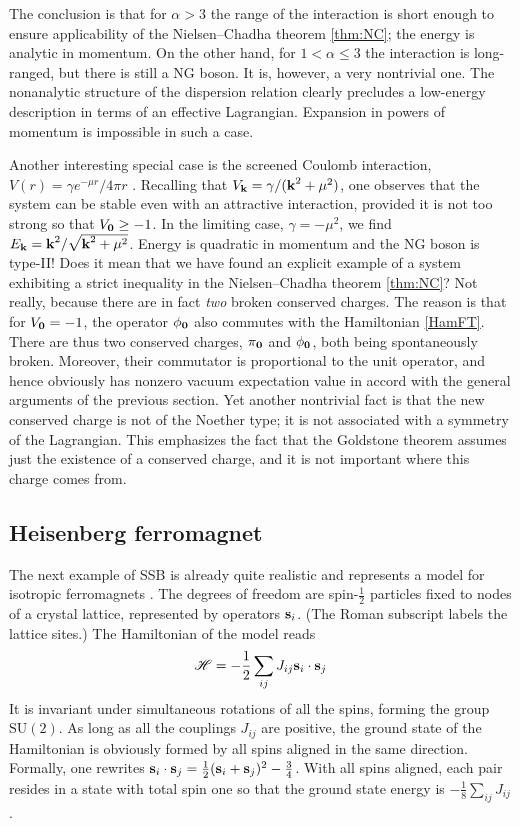 \documentclass[final,2p,times,12pt,sort&compress]{elsarticle}
\newcommand\gr[1]{\mathrm{#1}}              %
\newcommand\Ham{\mathscr{H}}                %
\newcommand\vek[1]{{\boldsymbol{\bf #1}}}   %
\begin{document}
The conclusion is that for $\alpha>3$ the range of the interaction is short
enough to ensure applicability of the Nielsen--Chadha theorem \ref{thm:NC}; the
energy is analytic in momentum. On the other hand, for $1<\alpha\leq3$ the
interaction is long-ranged, but there is still a NG boson. It is, however, a
very nontrivial one. The nonanalytic structure of the dispersion relation
clearly precludes a low-energy description in terms of an effective Lagrangian.
Expansion in powers of momentum is impossible in such a case.

Another interesting special case is the screened Coulomb interaction,
$V(r)=\gamma e^{-\mu r}/4\pi r$ \cite{Guralnik:1968gu}. Recalling that $V_{\vek
k}=\gamma/(\vek k^2+\mu^2)$, one observes that the system can be stable even
with an attractive interaction, provided it is not too strong so that
$V_{\vek0}\geq-1$. In the limiting case, $\gamma=-\mu^2$, we find $E_{\vek
k}=\vek k^2/\sqrt{\vek k^2+\mu^2}$. Energy is quadratic in momentum and the NG
boson is type-II! Does it mean that we have found an explicit example of a
system exhibiting a strict inequality in the Nielsen--Chadha theorem
\ref{thm:NC}? Not really, because there are in fact \emph{two} broken conserved
charges. The reason is that for $V_{\vek0}=-1$, the operator $\phi_{\vek0}$
also commutes with the Hamiltonian \eqref{HamFT}. There are thus two conserved
charges, $\pi_{\vek0}$ and $\phi_{\vek0}$, both being spontaneously broken.
Moreover, their commutator is proportional to the unit operator, and hence
obviously has nonzero vacuum expectation value in accord with the general
arguments of the previous section. Yet another nontrivial fact is that the new
conserved charge is not of the Noether type; it is not associated with a
symmetry of the Lagrangian. This emphasizes the fact that the Goldstone theorem
assumes just the existence of a conserved charge, and it is not important where
this charge comes from.


\subsection{Heisenberg ferromagnet}
\label{subsec:heisenberg}
The next example of SSB is already quite realistic and represents a model for
isotropic ferromagnets \cite{Lange:1966zz}. The degrees of freedom are
spin-$\frac12$ particles fixed to nodes of a crystal lattice, represented by
operators $\vek s_i$. (The Roman subscript labels the lattice sites.) The
Hamiltonian of the model reads
\begin{equation}
\Ham=-\frac12\sum_{ij}J_{ij}\vek s_i\cdot\vek s_j
\label{Heisenberg}
\end{equation}
It is invariant under simultaneous rotations of all the spins, forming the
group $\gr{SU(2)}$. As long as all the couplings $J_{ij}$ are positive, the
ground state of the Hamiltonian is obviously formed by all spins aligned in the
same direction. Formally, one rewrites $\vek s_i\cdot\vek s_j=\frac12(\vek
s_i+\vek s_j)^2-\frac34$. With all spins aligned, each pair resides in a state
with total spin one so that the ground state energy is
$-\frac18\sum_{ij}J_{ij}$.
\end{document}
